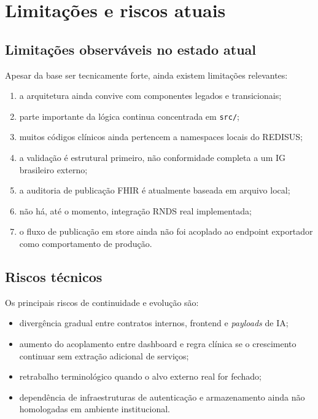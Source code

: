 \documentclass[
    12pt,
    openright,
    oneside,
    a4paper,
    chapter=TITLE,
    section=TITLE,
    brazil,
    sumario=tradicional,
    hidelinks
]{abntex2}
\begin{document}
\chapter{Limita\c{c}\~oes e riscos atuais}

\section{Limita\c{c}\~oes observ\'aveis no estado atual}

Apesar da base ser tecnicamente forte, ainda existem limita\c{c}\~oes relevantes:

\begin{enumerate}
    \item a arquitetura ainda convive com componentes legados e transicionais;
    \item parte importante da l\'ogica continua concentrada em \texttt{src/};
    \item muitos c\'odigos cl\'inicos ainda pertencem a namespaces locais do REDISUS;
    \item a valida\c{c}\~ao \'e estrutural primeiro, n\~ao conformidade completa a um IG brasileiro externo;
    \item a auditoria de publica\c{c}\~ao FHIR \'e atualmente baseada em arquivo local;
    \item n\~ao h\'a, at\'e o momento, integra\c{c}\~ao RNDS real implementada;
    \item o fluxo de publica\c{c}\~ao em store ainda n\~ao foi acoplado ao endpoint exportador como comportamento de produ\c{c}\~ao.
\end{enumerate}

\section{Riscos t\'ecnicos}

Os principais riscos de continuidade e evolu\c{c}\~ao s\~ao:

\begin{itemize}
    \item diverg\^encia gradual entre contratos internos, frontend e \textit{payloads} de IA;
    \item aumento do acoplamento entre dashboard e regra cl\'inica se o crescimento continuar sem extra\c{c}\~ao adicional de servi\c{c}os;
    \item retrabalho terminol\'ogico quando o alvo externo real for fechado;
    \item depend\^encia de infraestruturas de autentica\c{c}\~ao e armazenamento ainda n\~ao homologadas em ambiente institucional.
\end{itemize}
\end{document}
